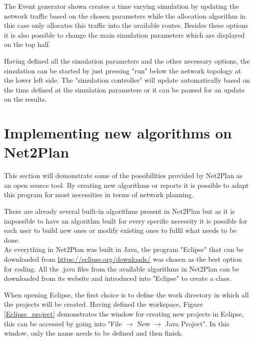 	The Event generator shown creates a time varying simulation by updating the network traffic based on the chosen parameters while the allocation algorithm in this case only allocates this traffic into the available routes. Besides these options it is also possible to change the main simulation parameters which are displayed on the top half.

	Having defined all the simulation parameters and the other necessary options, the simulation can be started by just pressing "run" below the network topology at the lower left side. The "simulation controller" will update automatically based on the time defined at the simulation parameters or it can be paused for an update on the results.
	
	\newpage

	\section{Implementing new algorithms on Net2Plan}
	\vspace{1cm}
	This section will demonstrate some of the possibilities provided by Net2Plan as an open source tool. By creating new algorithms or reports it is possible to adapt this program for most necessities in terms of network planning.

	There are already several built-in algorithms present in Net2Plan but as it is impossible to have an algorithm built for every specific necessity it is possible for each user to build new ones or modify existing ones to fulfil what needs to be done.\\
	
	As everything in Net2Plan was built in Java, the program "Eclipse" that can be downloaded from \url{https://eclipse.org/downloads/} was chosen as the best option for coding. All the .java files from the available algorithms in Net2Plan can be downloaded from its website and introduced into "Eclipse" to create a class.
	
	When opening Eclipse, the first choice is to define the work directory in which all the projects will be created. Having defined the workspace, Figure \ref{Eclipse_project} demonstrates the window for creating new projects in Eclipse, this can be accessed by going into "File $\rightarrow$ New $\rightarrow$ Java Project". In this window, only the name needs to be defined and then finish.
	
